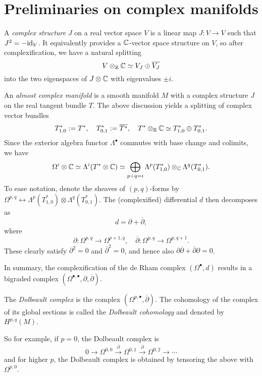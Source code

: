 \documentclass{article}
\newcommand{\dol}{\overline{\partial}}
\begin{document}
\self

\section{Preliminaries on complex manifolds}

A \emph{complex structure} $J$ on a real vector space $V$ is a linear map $J: V \to V$ such that $J^2 = -\mathrm{id}_V$. It equivalently provides a $\mathbb{C}$-vector space structure on $V$, so after complexification, we have a natural splitting
\[
    V \otimes_{\mathbb{R}} \mathbb{C} \simeq V_J \oplus \overline{V_J}
\]
into the two eigenspaces of $J\otimes \mathbb{C}$ with eigenvalues $\pm i$. 

An \emph{almost complex manifold} is a smooth manifold $M$ with a complex structure $J$ on the real tangent bundle $T$. The above discussion yields a splitting of complex vector bundles
\[
    T^*_{1,0}:=T^*,\quad T^*_{0,1}:=\overline{T^*},\quad T^* \otimes_{\mathbb{R}} \mathbb{C} \simeq T^*_{1,0} \oplus T^*_{0,1}.
\]
Since the exterior algebra functor $\Lambda^\bullet$ commutes with base change and colimits, we have
\[
    \Omega^i\otimes\mathbb{C} \simeq \Lambda^{i}(T^*\otimes\mathbb{C}) \simeq \bigoplus_{p+q=i} \Lambda^p(T^*_{1,0}) \otimes_{\mathbb{C}} \Lambda^q(T^*_{0,1}).
\]
To ease notation, denote the sheaves of $(p,q)$-forms by $\Omega^{p,q}\leftrightarrow \Lambda^p(T^*_{1,0}) \otimes \Lambda^q(T^*_{0,1})$. The (complexified) differential $d$ then decomposes as
\[
    d = \partial + \dol,
\]
where
\[
    \partial: \Omega^{p,q} \to \Omega^{p+1,q},\quad \dol: \Omega^{p,q} \to \Omega^{p,q+1}.
\]
These clearly satisfy $\partial^2 = 0$ and $\dol^2 = 0$, and hence also $\partial\dol+\dol\partial=0$.

In summary, the complexification of the de Rham complex $(\Omega^\bullet,d)$ results in a bigraded complex $(\Omega^{\bullet,\bullet},\partial,\dol)$.

\begin{definition}
    The \emph{Dolbeault complex} is the complex $(\Omega^{p,\bullet},\dol)$. The cohomology of the complex of its global sections is called the \emph{Dolbeault cohomology} and denoted by $H^{p,q}(M)$.
\end{definition}

So for example, if $p=0$, the Dolbeault complex is
\[
    0 \longrightarrow \Omega^{0,0} \xrightarrow{\ \dol\ } \Omega^{0,1} \xrightarrow{\ \dol\ } \Omega^{0,2} \longrightarrow \cdots
\]
and for higher $p$, the Dolbeault complex is obtained by tensoring the above with $\Omega^{p,0}$.
\end{document}
